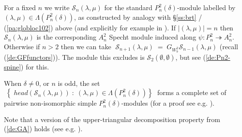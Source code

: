 \documentclass[reqno,10pt,a4paper]{amsart}
\newcommand{\C}{\mathbb{C}}
\newcommand{\blue}[1]{\textcolor{blue}{#1}}
\newcommand{\red}[1]{\textcolor{red}{#1}}
\newcommand{\ppm}[1]{\red{#1}}
\newcommand{\ca}[1]{\blue{#1}}
\newcommand{\nk}{n}  %
\newcommand{\cell}{\mathcal{S}}
\newcommand{\SSS}{\mathcal{S}} %
\newcommand{\ignore}[1]{}
\begin{document}


\ignore{{We recall from \cite{amm2019tonal}[Theorem 9.7] that the 2-tonal partition algebra $P_\nk^2(\delta)$ is generically semisimple over $\C$. Hence, similar to the ordinary partition algebra there is a modular system for each $\delta\in\C$, this is discussed in \cite{amm2019tonal}[9.8].}} 
For a fixed $n$   we write 
$\cell_n(
\lambda, \mu)$ 
for the standard $P_\nk^2(\delta)$-module labelled by 
$(
\lambda, \mu)\in \Lambda(P_\nk^2(\delta))$, 
as constructed 
by analogy with  \S\ref{ss:brt} / 
(\ref{pa:globloc102})
above 
(and explicitly for example in \cite[\S7.3]{amm2019tonal}). 
If $|(\lambda,\mu)|=n$ then $\SSS_n(\lambda,\mu)$ is the corresponding $A^2_n$ Specht module induced along $\psi: P^2_n \twoheadrightarrow A^2_n$.
Otherwise
if $n>2$ then we can take 
$\; \SSS_{n+1}(\lambda,\mu)  \; =\;  G_{W^2_b} \SSS_{n-1}(\lambda,\mu)$
(recall (\ref{de:GFfunctors})).
The module this excludes is  $\SSS_2(\emptyset,\emptyset)$,
but see (\ref{de:Pn2-spine}) for this. 



\mdef  \label{pa:P2head}
When $\delta\neq0$, {or $n$ is odd}, the set 
$\; \left\{ \; head(\cell_n(
\lambda, \mu)) \;:\;(\lambda, \mu)\in \Lambda(P_\nk^2(\delta))
\right\} \;$ 
forms a complete
set of pairwise non-isomorphic simple $P_\nk^2(\delta)$-modules 
(for a proof see e.g. \cite[Lemma 7.14]{amm2019tonal}). 

Note that a version of the upper-triangular decomposition property 
from (\ref{de:GA})
holds
(see e.g. \cite[9.4]{amm2019tonal}). 



\newcommand{\oo}{\emptyset,\emptyset}
\end{document}
